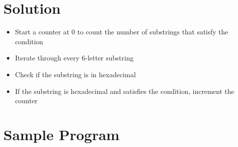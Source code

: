 \documentclass[12pt]{report}
\begin{document}
\section*{Solution}
\begin{itemize}
	\item Start a counter at 0 to count the number of substrings that satisfy the condition
	\item Iterate through every 6-letter substring
	\item Check if the substring is in hexadecimal
	\item If the substring is hexadecimal and satisfies the condition, increment the counter
\end{itemize}


\section*{Sample Program}

	
\end{document}
